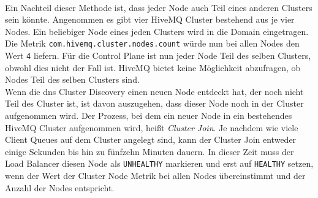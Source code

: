 \\
Ein Nachteil dieser Methode ist, dass jeder Node auch Teil eines anderen Clusters sein könnte. Angenommen es gibt vier HiveMQ Cluster bestehend aus je vier Nodes. Ein beliebiger Node eines jeden Clusters wird in die Domain eingetragen. Die Metrik \verb|com.hivemq.cluster.nodes.count| würde nun bei allen Nodes den Wert \verb|4| liefern. Für die Control Plane ist nun jeder Node Teil des selben Clusters, obwohl dies nicht der Fall ist. HiveMQ bietet keine Möglichkeit abzufragen, ob Nodes Teil des selben Clusters sind.
\\
Wenn die \ac{dns} Cluster Discovery einen neuen Node entdeckt hat, der noch nicht Teil des Cluster ist, ist davon auszugehen, dass dieser Node noch in der Cluster aufgenommen wird. Der Prozess, bei dem ein neuer Node in ein bestehendes HiveMQ Cluster aufgenommen wird, hei{\ss}t \textit{Cluster Join}. Je nachdem wie viele Client Queues auf dem Cluster angelegt sind, kann der Cluster Join entweder einige Sekunden bis hin zu fünfzehn Minuten dauern. In dieser Zeit muss der Load Balancer diesen Node als \verb|UNHEALTHY| markieren und erst auf \verb|HEALTHY| setzen, wenn der Wert der Cluster Node Metrik bei allen Nodes übereinstimmt und der Anzahl der Nodes entspricht.

